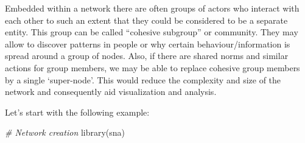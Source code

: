 \documentclass[
  notitlepage,
  onecolumn,
  openany]{book}
\newenvironment{Shaded}{\begin{snugshade}}{\end{snugshade}}
\newcommand{\CommentTok}[1]{\textcolor[rgb]{0.56,0.35,0.01}{\textit{#1}}}
\newcommand{\FunctionTok}[1]{\textcolor[rgb]{0.00,0.00,0.00}{#1}}
\newcommand{\NormalTok}[1]{#1}
\begin{document}
Embedded within a network there are often groups of actors who interact with each other to such an extent that they could be considered to be a separate entity. This group can be called ``cohesive subgroup'' or community. They may allow to discover patterns in people or why certain behaviour/information is spread around a group of nodes. Also, if there are shared norms and similar actions for group members, we may be able to replace cohesive group members by a single `super-node'. This would reduce the complexity and size of the network and consequently aid visualization and analysis.

Let's start with the following example:

\begin{Shaded}
\begin{Highlighting}[]
\CommentTok{\# Network creation}
\FunctionTok{library}\NormalTok{(sna)}


\end{Highlighting}
\end{Shaded}
\end{document}
